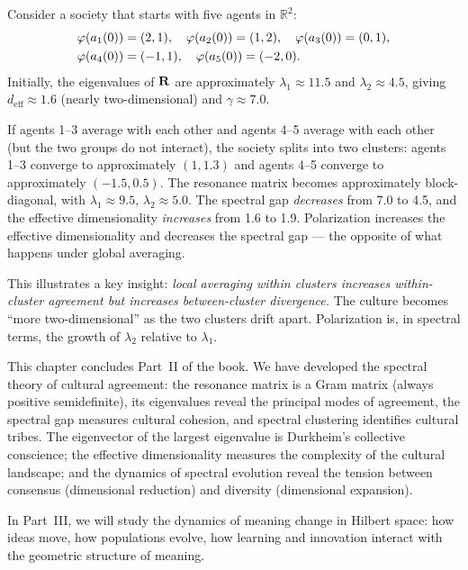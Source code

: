 \begin{example}
\label{ex:polarizing}
Consider a society that starts with five agents in $\mathbb{R}^2$:
\begin{align*}
  \varphi(a_1(0)) &= (2, 1), \quad \varphi(a_2(0)) = (1, 2), \quad
  \varphi(a_3(0)) = (0, 1), \\
  \varphi(a_4(0)) &= (-1, 1), \quad \varphi(a_5(0)) = (-2, 0).
\end{align*}
Initially, the eigenvalues of $\mathbf{R}$ are approximately $\lambda_1 \approx 11.5$
and $\lambda_2 \approx 4.5$, giving $d_{\text{eff}} \approx 1.6$ (nearly
two-dimensional) and $\gamma \approx 7.0$.

If agents 1--3 average with each other and agents 4--5 average with each other
(but the two groups do not interact), the society splits into two clusters:
agents 1--3 converge to approximately $(1, 1.3)$ and agents 4--5 converge to
approximately $(-1.5, 0.5)$. The resonance matrix becomes approximately
block-diagonal, with $\lambda_1 \approx 9.5$, $\lambda_2 \approx 5.0$. The
spectral gap \emph{decreases} from 7.0 to 4.5, and the effective
dimensionality \emph{increases} from 1.6 to 1.9. Polarization increases the
effective dimensionality and decreases the spectral gap --- the opposite of
what happens under global averaging.

This illustrates a key insight: \emph{local averaging within clusters increases
within-cluster agreement but increases between-cluster divergence.} The
culture becomes ``more two-dimensional'' as the two clusters drift apart.
Polarization is, in spectral terms, the growth of $\lambda_2$ relative to
$\lambda_1$.
\end{example}

\bigskip

This chapter concludes Part~II of the book. We have developed the spectral
theory of cultural agreement: the resonance matrix is a Gram matrix (always
positive semidefinite), its eigenvalues reveal the principal modes of
agreement, the spectral gap measures cultural cohesion, and spectral
clustering identifies cultural tribes. The eigenvector of the largest eigenvalue
is Durkheim's collective conscience; the effective dimensionality measures the
complexity of the cultural landscape; and the dynamics of spectral evolution
reveal the tension between consensus (dimensional reduction) and diversity
(dimensional expansion).

In Part~III, we will study the dynamics of meaning change in Hilbert space:
how ideas move, how populations evolve, how learning and innovation interact
with the geometric structure of meaning.

